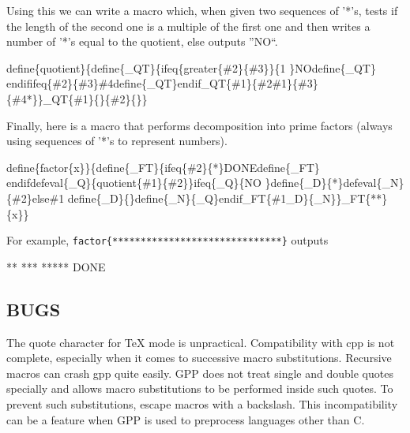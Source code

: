 Using this we can write a macro which, when given two sequences of '*'s, tests
if the length of the second one is a multiple of the first one and then writes
a number of '*'s equal to the quotient, else outputs ''NO``. 

\begin{PRE}
  {\htmlBackslash}define\{quotient\}\{{\htmlBackslash}define\{\_QT\}\{{\htmlBackslash}ifeq\{{\htmlBackslash}greater\{\#2\}\{\#3\}\}\{1
  \}NO{\htmlBackslash}define\{\_QT\}
  {\htmlBackslash}endif{\htmlBackslash}ifeq\{\#2\}\{\#3\}\#4{\htmlBackslash}define\{\_QT\}{\htmlBackslash}endif{\htmlBackslash}\_QT\{\#1\}\{\#2\#1\}\{\#3\}\{\#4*\}\}{\htmlBackslash}\_QT\{\#1\}\{\}\{\#2\}\{\}\}
\end{PRE}

Finally, here is a macro that performs decomposition into prime factors
(always using sequences of '*'s to represent numbers). 

\begin{PRE}
  {\htmlBackslash}define\{{\htmlBackslash}factor\{x\}\}\{{\htmlBackslash}define\{\_FT\}\{{\htmlBackslash}ifeq\{\#2\}\{*\}DONE{\htmlBackslash}define\{\_FT\}
  {\htmlBackslash}endif{\htmlBackslash}defeval\{\_Q\}\{{\htmlBackslash}quotient\{\#1\}\{\#2\}\}{\htmlBackslash}ifeq\{{\htmlBackslash}\_Q\}\{NO
  \}{\htmlBackslash}define\{\_D\}\{*\}{\htmlBackslash}defeval\{\_N\}\{\#2\}{\htmlBackslash}else\#1
  {\htmlBackslash}define\{\_D\}\{\}{\htmlBackslash}define\{\_N\}\{{\htmlBackslash}\_Q\}{\htmlBackslash}endif{\htmlBackslash}\_FT\{\#1{\htmlBackslash}\_D\}\{{\htmlBackslash}\_N\}\}{\htmlBackslash}\_FT\{**\}\{{\htmlBackslash}x\}\}
\end{PRE}

For example, {\tt {\htmlBackslash}factor\{******************************\}}
outputs 

\begin{PRE}
  **
  ***
  *****
  DONE
\end{PRE}

\htmlHR

\subsection{BUGS}

The quote character for TeX mode is unpractical.  Compatibility with cpp is
not complete, especially when it comes to successive macro substitutions.
Recursive macros can crash gpp quite easily.  GPP does not treat single and
double quotes specially and allows macro substitutions to be performed
inside such quotes. To prevent such substitutions, escape macros with a
backslash. This incompatibility can be a feature when GPP is used to
preprocess languages other than C.



